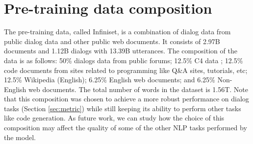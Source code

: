\documentclass{article}
\begin{document}
\begin{table}[h!]
    \caption{Hyper-parameters for pre-training 2B, 8B and 137B models. All models were trained with 256K tokens per batch.}
    \centering
    \label{tab:hyper-params}
\end{table}

\section{Pre-training data composition}
\label{infiniset-details}
The pre-training data, called Infiniset, is a combination of dialog data from public dialog data and other public web documents. It consists of 2.97B documents and 1.12B dialogs with 13.39B utterances. The composition of the data is as follows: 50\% dialogs data from public forums; 12.5\% C4 data \cite{t5}; 12.5\% code documents from sites related to programming like Q\&A sites, tutorials, etc; 12.5\% Wikipedia (English); 6.25\% English web documents; and 6.25\% Non-English web documents. The total number of words in the dataset is 1.56T. Note that this composition was chosen to achieve a more robust performance on dialog tasks (Section \ref{sec:metric}) while still keeping its ability to perform other tasks like code generation. As future work, we can study how the choice of this composition may affect the quality of some of the other NLP tasks performed by the model. 
\end{document}
